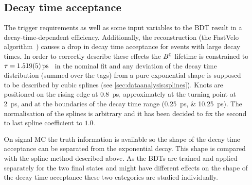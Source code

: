 \subsection{Decay time acceptance}
\label{sec:b02dd:decaytimefit:acceptance}

The trigger requirements as well as some input variables to the BDT result in
a decay-time-dependent efficiency. Additionally, the \velo reconstruction
(\ie the FastVelo algorithm~\cite{Callot:2011bza}) causes a drop in decay time
acceptance for events with large decay times. In order to correctly describe
these effects the ${{B}^0}$ lifetime is constrained to $\tau =
\SI{1.519\pm0.005}{\ps}$~\cite{PDG2014} in the nominal fit and any deviation
of the decay time distribution (summed over the tags) from a pure exponential
shape is supposed to be described by cubic splines (see
\cref{sec:dataanalysis:splines}). Knots are positioned on the rising edge at
\SI{0.8}{\ps}, approximately at the turning point at \SI{2}{\ps}, and at the
boundaries of the decay time range (\SIlist{0.25;10.25}{\ps}). The
normalisation of the splines is arbitrary and it has been decided to fix the
second to last spline coefficient to $\num{1.0}$.

On signal MC the truth information is available so the shape of the decay time
acceptance can be separated from the exponential decay. This shape is compared
with the spline method described above. As the BDTs are trained and applied
separately for the two final states and might have different effects on the
shape of the decay time acceptance these two categories are studied
individually.

